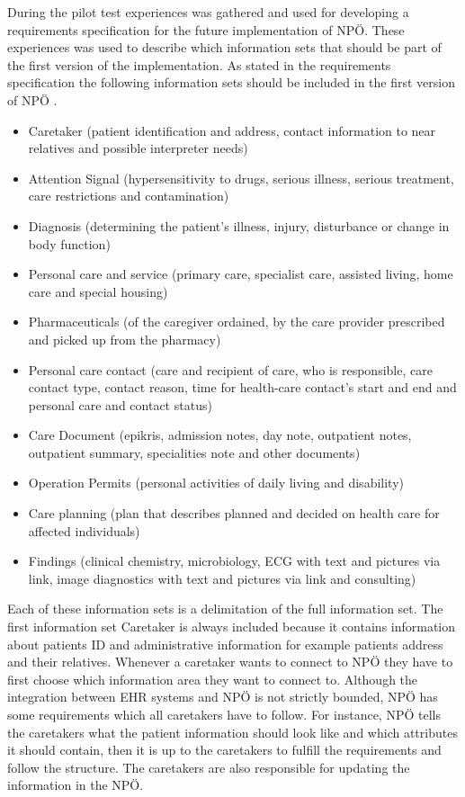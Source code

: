 \documentclass[14pt]{article}
\begin{document}
During the pilot test experiences was gathered and used for developing a requirements specification for the future implementation of NPÖ. These experiences was used to describe which information sets that should be part of the first version of the implementation. As stated in the requirements specification the following information sets should be included in the first version of NPÖ \cite{Npotest}.
\begin{itemize}
\item Caretaker (patient identification and address, contact information to near relatives and possible interpreter needs)
\item Attention Signal (hypersensitivity to drugs, serious illness, serious treatment, care restrictions and contamination)
\item Diagnosis (determining the patient's illness, injury, disturbance or change in body function)
\item Personal care and service (primary care, specialist care, assisted living, home care and special housing)
\item Pharmaceuticals (of the caregiver ordained, by the care provider prescribed and picked up from the pharmacy)
\item Personal care contact (care and recipient of care, who is responsible, care contact type, contact reason, time for health-care contact's start and end and personal care and contact status)
\item Care Document (epikris, admission notes, day note, outpatient notes, outpatient summary, specialities note and other documents)
\item Operation Permits (personal activities of daily living and disability)
\item Care planning (plan that describes planned and decided on health care for affected individuals)
\item Findings (clinical chemistry, microbiology, ECG with text and pictures via link, image diagnostics with text and pictures via link and consulting)
\end{itemize}
Each of these information sets is a delimitation of the full information set. The first information set Caretaker is always included because it contains information about patients ID and administrative information for example patients address and their relatives. Whenever a caretaker wants to connect to NPÖ they have to first choose which information area they want to connect to. Although the integration between EHR systems and NPÖ is not strictly bounded, NPÖ has some requirements which all caretakers have to follow. For instance, NPÖ tells the caretakers what the patient information should look like and which attributes it should contain, then it is up to the caretakers to fulfill the requirements and follow the structure. The caretakers are also responsible for updating the information in the NPÖ. 
\end{document}
